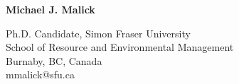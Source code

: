 \documentclass[11pt]{article}
\begin{document}
\thispagestyle{firststyle}


\begin{center}
{\Huge \textbf{Michael J. Malick}}
  \vspace*{0.25cm}

    Ph.D. Candidate, Simon Fraser University \\
    School of Resource and Environmental Management \\
    Burnaby, BC, Canada \\
    mmalick@sfu.ca \\
  
\end{center}
  \vspace*{0.25cm}






  
\end{document}

